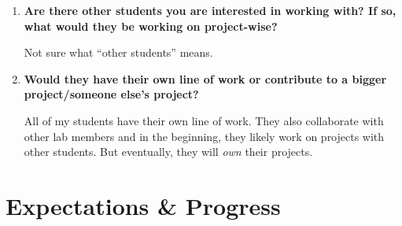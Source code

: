 \documentclass{article}
\begin{document}
\begin{enumerate}[label=\arabic*.]
    However, if you want to work on some areas that I am not interested in, then I would rather you find another faculty because I can't guide a topic I don't know or care about.

    That said, I am open to new ideas \emph{if} you can convince me you can make them work. The best way to do that is as follows: if you come up with an idea that is quite different than what you're working on, \emph{DO NOT} tell me about it, especially if you don't have good things to back it up, because I will likely shoot it down. Instead, just pursue it (while still working on your main project), and build \emph{a prototype} and achieve some \emph{good results}. If you can show me your ideas work with concrete results, I will much more open to them. This happens multiple times in my lab, and probably some my students are currently working on secret ideas that I don't know about yet!

    \item \textbf{Are there other students you are interested in working with? If so, what would they be working on project-wise?}  
    
    Not sure what ``other students'' means.

    \item \textbf{Would they have their own line of work or contribute to a bigger project/someone else's project?}  
    
    All of my students have their own line of work.  They also collaborate with other lab members and in the beginning, they likely work on projects with other students. But eventually, they will \textit{own} their projects.
\end{enumerate}

\section{Expectations \& Progress}
\end{document}

